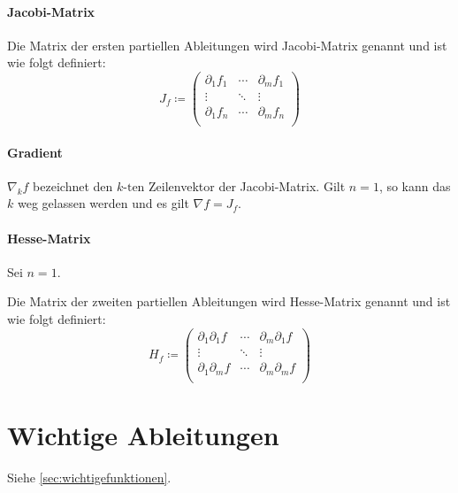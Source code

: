         \paragraph{Jacobi-Matrix}
            Die Matrix der ersten partiellen Ableitungen wird Jacobi-Matrix genannt und ist wie folgt definiert:
            \begin{equation*}
                J _ f \coloneqq
                \begin{pmatrix}
                    \partial _ 1 f _ 1 & \cdots & \partial _ m f _ 1 \\
                    \vdots & \ddots & \vdots \\
                    \partial _ 1 f _ n & \cdots & \partial _ m f _ n \\
                \end{pmatrix}
            \end{equation*}

        \paragraph{Gradient}
            $ \nabla _ k f $ bezeichnet den $ k\text{-ten} $ Zeilenvektor der Jacobi-Matrix. Gilt $ n = 1 $, so kann das $ k $ weg gelassen werden und es gilt $ \nabla f = J _ f $.

        \paragraph{Hesse-Matrix}
            Sei $ n = 1 $.

            Die Matrix der zweiten partiellen Ableitungen wird Hesse-Matrix genannt und ist wie folgt definiert:
            \begin{equation*}
                H _ f \coloneqq
                \begin{pmatrix}
                    \partial _ 1 \partial _ 1 f & \cdots & \partial _ m \partial _ 1 f \\
                    \vdots & \ddots & \vdots \\
                    \partial _ 1 \partial _ m f & \cdots & \partial _ m \partial _ m f \\
                \end{pmatrix}
            \end{equation*}

    \section{Wichtige Ableitungen}
        Siehe \ref{sec:wichtigefunktionen}.

